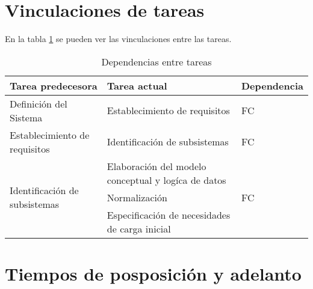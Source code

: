 \documentclass[11pt,a4paper,spanish,twoside]{book}
\begin{document}
\section{Vinculaciones de tareas}
En la tabla \ref{Tab:Dep} se pueden ver las vinculaciones entre las tareas.
\begin{table}[!h]
  \centering
  \small
  \begin{tabular}{l|p{5cm}|l}
    \textbf{Tarea predecesora} & \textbf{Tarea actual} & \textbf{Dependencia}\\
    \hline
    Definición del Sistema & Establecimiento de requisitos & FC \\
    \hline
    Establecimiento de requisitos & Identificación de subsistemas & FC \\
    \hline
    \multirow{3}{*}{Identificación de subsistemas} & Elaboración del modelo 
conceptual y logíca de datos & \multirow{3}{*}{FC} \\
    & Normalización \\
    & Especificación de necesidades de carga inicial \\
    
  \end{tabular}
  \caption{Dependencias entre tareas} \label{Tab:Dep}
\end{table}

\section{Tiempos de posposición y adelanto}
\end{document}
